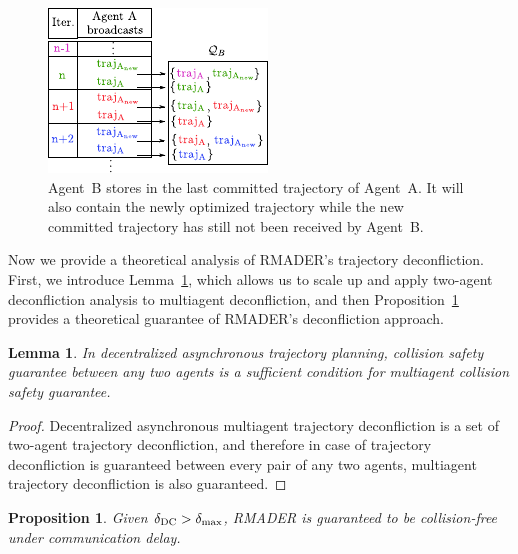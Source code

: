 \begin{figure}[h]
    \centering
    \includegraphics[width=0.6\columnwidth]{figures/QB_definition.pdf}
    \setlength{\belowcaptionskip}{-0.5em}
    \caption[Trajectory storing scheme]{Agent~B stores in \QB{} the last committed trajectory of Agent~A. It will also contain the newly optimized trajectory \trajANew{} while the new committed trajectory has still not been received by Agent~B. }
    \label{fig:QB_definition}
\end{figure}

Now we provide a theoretical analysis of RMADER's trajectory deconfliction. 
First, we introduce Lemma~\ref{lem:two_agent_suffices_multiagent}, which allows us to scale up and apply two-agent deconfliction analysis to multiagent deconfliction, and then Proposition~\ref{prop:rmader_deconfliction_theorem} provides a theoretical guarantee of RMADER's deconfliction approach. 

\newtheorem{lemma}{Lemma}
\begin{lemma}
\label{lem:two_agent_suffices_multiagent}
In decentralized asynchronous trajectory planning, collision safety guarantee between any two agents is a sufficient condition for multiagent collision safety guarantee. 
\end{lemma}

\begin{proof}
Decentralized asynchronous multiagent trajectory deconfliction is a set of two-agent trajectory deconfliction, and therefore in case of trajectory deconfliction is guaranteed between every pair of any two agents, multiagent trajectory deconfliction is also guaranteed. 
\end{proof}

\newtheorem{prop}{Proposition}
\begin{prop}
\label{prop:rmader_deconfliction_theorem}
Given $\delta_\text{DC}{}>\delta_\text{max}{}$, RMADER is guaranteed to be collision-free under communication delay.
\end{prop}

